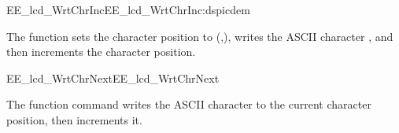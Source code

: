 \begin{function_nopb2}{EE\_lcd\_WrtChrInc}{EE_lcd_WrtChrInc:dspicdem}
  
  \begin{fundescription}
    The function sets the character position to
    (,), writes the ASCII character ,
    and then increments the character position.
  \end{fundescription}
  
  \begin{funparameters}
  \end{funparameters}
  
  
\end{function_nopb2}

\begin{function_nopb2}{EE\_lcd\_WrtChrNext}{EE_lcd_WrtChrNext}
  
  \begin{fundescription}
    The function command writes the ASCII character  to
    the current character position, then increments it.
  \end{fundescription}
  
  \begin{funparameters}
  \end{funparameters}
  
  
\end{function_nopb2}

